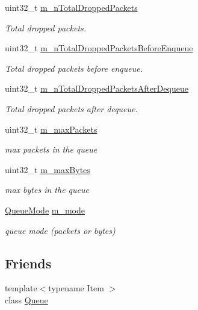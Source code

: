 \begin{DoxyCompactItemize}
uint32\+\_\+t \hyperlink{classns3_1_1QueueBase_a92e199a6816438e21d8af97714842f9c}{m\+\_\+n\+Total\+Dropped\+Packets}
\begin{DoxyCompactList}\small\item\em Total dropped packets. \end{DoxyCompactList}\item 
uint32\+\_\+t \hyperlink{classns3_1_1QueueBase_a91c2cfb7155257d8b35a51b42bda697a}{m\+\_\+n\+Total\+Dropped\+Packets\+Before\+Enqueue}
\begin{DoxyCompactList}\small\item\em Total dropped packets before enqueue. \end{DoxyCompactList}\item 
uint32\+\_\+t \hyperlink{classns3_1_1QueueBase_a341138319f0891e67670f471723898b2}{m\+\_\+n\+Total\+Dropped\+Packets\+After\+Dequeue}
\begin{DoxyCompactList}\small\item\em Total dropped packets after dequeue. \end{DoxyCompactList}\item 
uint32\+\_\+t \hyperlink{classns3_1_1QueueBase_afa827170d7f381fb001722394b50b1ff}{m\+\_\+max\+Packets}
\begin{DoxyCompactList}\small\item\em max packets in the queue \end{DoxyCompactList}\item 
uint32\+\_\+t \hyperlink{classns3_1_1QueueBase_a28904f9e2223a440dcb03db0c09fa8d2}{m\+\_\+max\+Bytes}
\begin{DoxyCompactList}\small\item\em max bytes in the queue \end{DoxyCompactList}\item 
\hyperlink{classns3_1_1QueueBase_adc473162c2a2bcb3d76d151d6d7ee02a}{Queue\+Mode} \hyperlink{classns3_1_1QueueBase_a055b3b49d99e9180159639c993be2d98}{m\+\_\+mode}
\begin{DoxyCompactList}\small\item\em queue mode (packets or bytes) \end{DoxyCompactList}\end{DoxyCompactItemize}
\subsection*{Friends}
\begin{DoxyCompactItemize}
\item 
{\footnotesize template$<$typename Item $>$ }\\class \hyperlink{classns3_1_1QueueBase_a76db68f71f6e65aa4083615ee111ab59}{Queue}
\end{DoxyCompactItemize}
